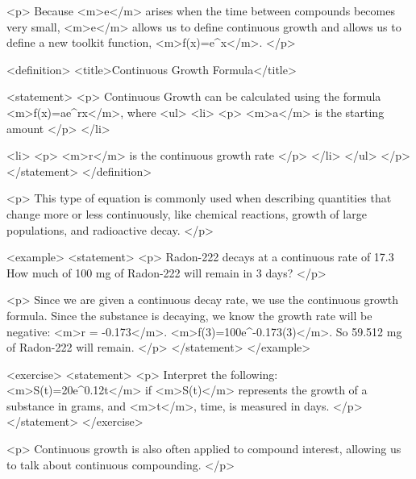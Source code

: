         <p>
            Because <m>e</m> arises when the time between compounds becomes very small, <m>e</m> allows us to define continuous growth and allows us to define a new toolkit function, <m>f(x)=e^{x}</m>.
        </p>

        <definition>
            <title>Continuous Growth Formula</title>

            <statement>
                <p>
                    Continuous Growth can be calculated using the formula <m>f(x)=ae^{rx}</m>, where
                    <ul>
                        <li>
                            <p>
                                <m>a</m> is the starting amount
                            </p>
                        </li>

                        <li>
                            <p>
                                <m>r</m> is the continuous growth rate
                            </p>
                        </li>
                    </ul>
                </p>
            </statement>
        </definition>

        <p>
            This type of equation is commonly used when describing quantities that change more or less continuously, like chemical reactions, growth of large populations, and radioactive decay.
        </p>

        <example>
            <statement>
                <p>
                    Radon-222 decays at a continuous rate of 17.3%
                    How much of 100 mg of Radon-222 will remain in 3 days?
                </p>

                <p>
                    Since we are given a continuous decay rate, we use the continuous growth formula.
                    Since the substance is decaying, we know the growth rate will be negative: <m>r = -0.173</m>.
                    <m>f(3)=100e^{-0.173(3)}</m>.
                    So 59.512 mg of Radon-222 will remain.
                </p>
            </statement>
        </example>

        <exercise>
            <statement>
                <p>
                    Interpret the following: <m>S(t)=20e^{0.12t}</m> if <m>S(t)</m> represents the growth of a substance in grams, and <m>t</m>, time, is measured in days.
                </p>
            </statement>
        </exercise>

        <p>
            Continuous growth is also often applied to compound interest, allowing us to talk about continuous compounding.
        </p>

